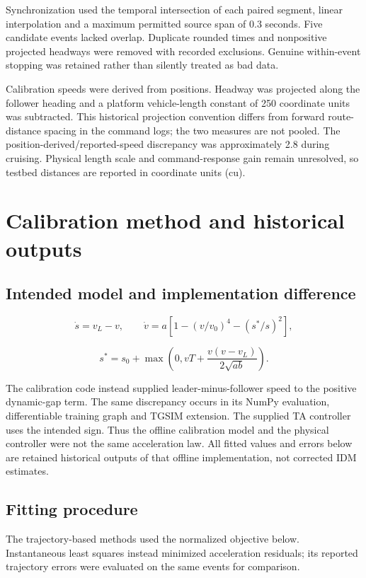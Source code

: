\documentclass[11pt,a4paper]{article}
\begin{document}
Synchronization used the temporal intersection of each paired segment, linear interpolation and a maximum permitted source span of 0.3 seconds. Five candidate events lacked overlap. Duplicate rounded times and nonpositive projected headways were removed with recorded exclusions. Genuine within-event stopping was retained rather than silently treated as bad data.


Calibration speeds were derived from positions. Headway was projected along the follower heading and a platform vehicle-length constant of 250 coordinate units was subtracted. This historical projection convention differs from forward route-distance spacing in the command logs; the two measures are not pooled. The position-derived/reported-speed discrepancy was approximately 2.8 during cruising. Physical length scale and command-response gain remain unresolved, so testbed distances are reported in coordinate units (cu).


\newpage

\section{Calibration method and historical outputs}

\subsection*{Intended model and implementation difference}

\[
\dot s=v_L-v,\qquad \dot v=a\left[1-(v/v_0)^4-(s^*/s)^2\right],
\]

\[
s^*=s_0+\max\left(0,vT+\frac{v(v-v_L)}{2\sqrt{ab}}\right).
\]

The calibration code instead supplied leader-minus-follower speed to the positive dynamic-gap term. The same discrepancy occurs in its NumPy evaluation, differentiable training graph and TGSIM extension. The supplied TA controller uses the intended sign. Thus the offline calibration model and the physical controller were not the same acceleration law. All fitted values and errors below are retained historical outputs of that offline implementation, not corrected IDM estimates.


\subsection*{Fitting procedure}

The trajectory-based methods used the normalized objective below. Instantaneous least squares instead minimized acceleration residuals; its reported trajectory errors were evaluated on the same events for comparison.
\end{document}
